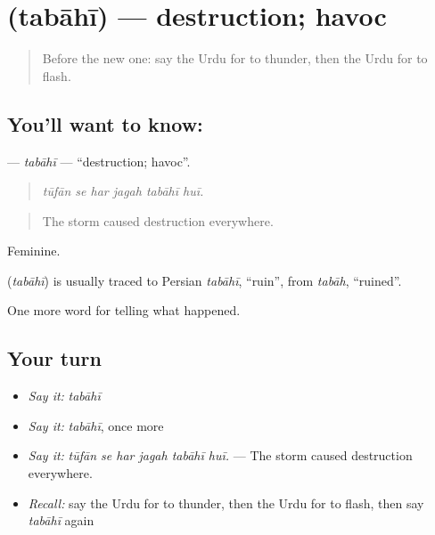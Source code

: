 \section[\texorpdfstring{\ur{تباہی} (tabāhī)}{تباہی (tabāhī)}]{ (tabāhī) — destruction; havoc}

\label{lesson:UR-C292-tabahi}



\begin{quote}
Before the new one: say the Urdu for to thunder, then the Urdu for to flash.
\end{quote}

\subsection*{You'll want to know: }
\textbf{} — \emph{tabāhī} — \textquotedblleft{}destruction; havoc\textquotedblright{}.

\begin{quote}
     
\end{quote}

\begin{quote}
\emph{tūfān se har jagah tabāhī huī.}
\end{quote}

\begin{quote}
The storm caused destruction everywhere.
\end{quote}

Feminine.

\begin{cousinweb}
\textbf{} (\emph{tabāhī}) is usually traced to Persian \emph{tabāhī}, \textquotedblleft{}ruin\textquotedblright{}, from \emph{tabāh}, \textquotedblleft{}ruined\textquotedblright{}.
\end{cousinweb}

\begin{grammarlens}[title={What you've built}]
One more word for telling what happened.
\end{grammarlens}

\subsection*{Your turn}
\begin{itemize}
\raggedright
  \item \emph{Say it:} \emph{tabāhī}
  \item \emph{Say it:} \emph{tabāhī}, once more
  \item \emph{Say it:} \emph{tūfān se har jagah tabāhī huī.} — The storm caused destruction everywhere.
  \item \emph{Recall:} say the Urdu for to thunder, then the Urdu for to flash, then say \emph{tabāhī} again
\end{itemize}

